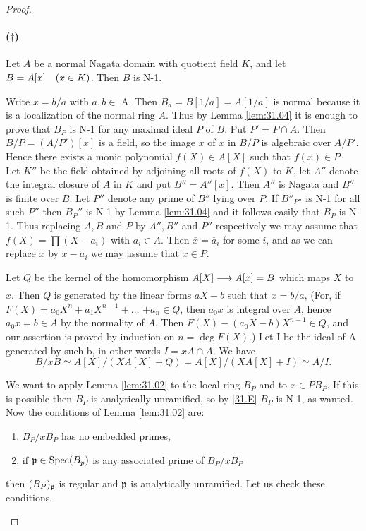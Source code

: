 \documentclass[../main]{subfiles}
\begin{document}
\begin{proof}
\begin{enumerate}
\paragraph{($\dagger$)}\label{31.dagger} Let $A$ be a normal Nagata domain with quotient field $K$, and let $B=A[x]\for{x \in K}$. Then $B$ is N-1.

Write $x=b / a$ with $a, b \in$ A. Then $B_{a}=B[1 / a]=A[1 / a]$ is normal because it is a localization of the normal ring $A$. Thus by Lemma \ref{lem:31.04} it is enough to prove that $B_{P}$ is N-1 for any maximal ideal $P$ of $B .$ Put $P'=P \cap A .$ Then $B / P=(A / P')[\overline{x}]$ is a field, so the image $\overline{x}$ of $x$ in $B / P$ is algebraic over $A / P'$. Hence there exists a monic polynomial $f(X) \in A[X]$ such that $f(x) \in P \cdot$ Let $K''$ be the field obtained by adjoining all roots of $f(X)$ to $K$, let $A''$ denote the integral closure of $A$ in $K$ and put $B''=A''[x]$. Then $A''$ is Nagata and $B''$ is finite over $B$. Let $P''$ denote any prime of $B''$ lying over $P$. If $B''_{P''}$ is N-1 for all such $P''$ then $B_{P}''$ is N-1 by Lemma \ref{lem:31.04} and it follows easily that $B_{P}$ is N-1. Thus replacing $A, B$ and $P$ by $A'', B''$ and $P''$ respectively we may assume that $f(X)=\prod (X-a_{i})$ with $a_{i} \in A$. Then $\overline{x}=\overline{a}_{i}$ for some $i$, and as we can replace $x$ by $x-a_{i}$ we may assume that $x \in P$.

Let $Q$ be the kernel of the homomorphism $A[X] \varrightarrow{} A[x]=B$ which maps $X$ to $x$. Then $Q$ is generated by the linear forms $a X-b$ such that $x=b / a$, (For, if $F(X)=a_{0} X^{n}+a_{1} X^{n-1}+\ldots$ $+a_{n} \in Q$, then $a_{0} x$ is integral over $A$, hence $a_{0} x=b \in A$ by the normality of $A$. Then $F(X)-(a_{0} X-b) X^{n-1} \in Q$, and our assertion is proved by induction on $n=\deg F(X)$.) Let I be the ideal of A generated by such b, in other words $I=xA \cap A$. We have \[B / x B \simeq A[X] /(X A[X]+Q)=A[X] /(X A[X]+I)\simeq A / I.\]

We want to apply Lemma \ref{lem:31.02} to the local ring $B_P$ and to $x \in PB_{P}$. If this is possible then $B_{P}$ is analytically unramified, so by \ref{31.E} $B_{P}$ is N-1, as wanted. Now the conditions of Lemma \ref{lem:31.02} are: 
\begin{enumerate}[label=(\arabic*)]
    \item $B_P/xB_P$ has no embedded primes,
    \item if $\mathfrak{p}\in \operatorname{Spec}(B_p)$ is any associated prime of $B_P/xB_P$ 
\end{enumerate}
then $(B_P)_{\mathfrak{p}}$ is regular and $\mathfrak{p}$ is analytically unramified. Let us check these conditions.


\end{enumerate}
\end{proof}
\end{document}
